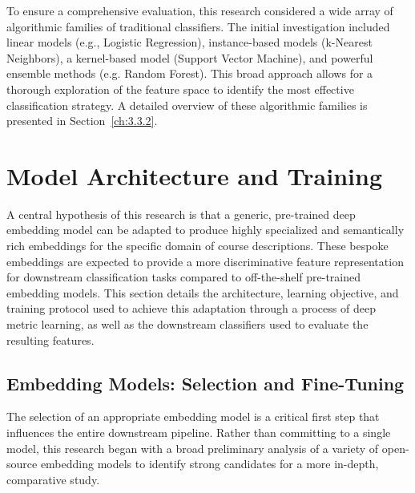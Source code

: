 To ensure a comprehensive evaluation, this research considered a wide array of algorithmic families of traditional classifiers. The initial investigation included linear models (e.g., Logistic Regression), instance-based models (k-Nearest Neighbors), a kernel-based model (Support Vector Machine), and powerful ensemble methods (e.g. Random Forest). This broad approach allows for a thorough exploration of the feature space to identify the most effective classification strategy. A detailed overview of these algorithmic families is presented in Section~\ref{ch:3.3.2}.

\section{Model Architecture and Training}\label{ch:3.3}
A central hypothesis of this research is that a generic, pre-trained deep embedding model can be adapted to produce highly specialized and semantically rich embeddings for the specific domain of course descriptions. These bespoke embeddings are expected to provide a more discriminative feature representation for downstream classification tasks compared to off-the-shelf pre-trained embedding models. This section details the architecture, learning objective, and training protocol used to achieve this adaptation through a process of deep metric learning, as well as the downstream classifiers used to evaluate the resulting features.

\subsection{Embedding Models: Selection and Fine-Tuning}\label{ch:3.3.1}
The selection of an appropriate embedding model is a critical first step that influences the entire downstream pipeline. Rather than committing to a single model, this research began with a broad preliminary analysis of a variety of open-source embedding models to identify strong candidates for a more in-depth, comparative study.

